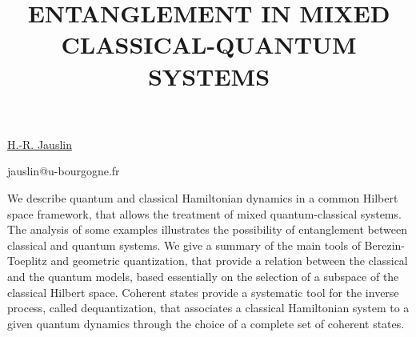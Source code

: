 \title{ENTANGLEMENT IN MIXED CLASSICAL-QUANTUM SYSTEMS}

\underline{H.-R. Jauslin}

{\normalsize{
\vspace{-4mm}\dijon

\email jauslin@u-bourgogne.fr}}

We describe quantum and classical Hamiltonian dynamics in a common Hilbert space framework, that allows the treatment of mixed
quantum-classical systems. The analysis of some examples illustrates the possibility of entanglement between classical and
quantum systems. We give a summary of the main tools of Berezin-Toeplitz and geometric quantization, that provide a relation
between the classical and the quantum models, based essentially on the selection of a subspace of the classical Hilbert space.
Coherent states provide a systematic tool for the inverse process, called dequantization, that associates a  classical Hamiltonian
system to a given quantum dynamics through the choice of a complete set of coherent states.

\vspace{\baselineskip} 